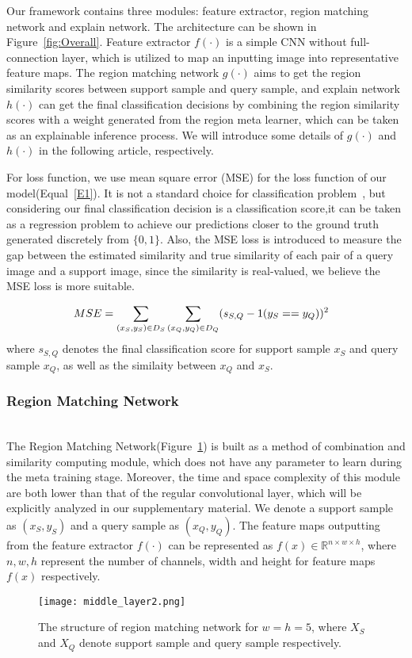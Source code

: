 \documentclass[letterpaper]{article}
\begin{document}
Our framework contains three modules: feature extractor, region matching network and explain network. The architecture can be shown in Figure~\ref{fig:Overall}. Feature extractor $f(\cdot)$ is a simple CNN without full-connection layer, which is utilized to map an inputting image into representative feature maps. The region matching network $g(\cdot)$ aims to get the region similarity scores between support sample and query sample, and explain network $h(\cdot)$ can get the final classification decisions by combining the region similarity scores with a weight generated from the region meta learner, which can be taken as an explainable inference process. We will introduce some details of $g(\cdot)$ and $h(\cdot)$ in the following article, respectively. 

For loss function, we use mean square error (MSE) for the loss function of our model(Equal~\ref{E1}). It is not a standard choice for classification problem~\cite{sung2018learning}, but considering our final classification decision is a classification score,it can be taken as a regression problem to achieve our predictions closer to the ground truth generated discretely from $\{0,1\}$. Also, the MSE loss is introduced to measure the gap between the estimated similarity and true similarity of each pair of a query image and a support image, since the similarity is real-valued, we believe the MSE loss is more suitable.

\begin{equation}\scriptsize
    MSE = \sum_{(x_{S},y_{S})\in D_{S}} \sum_{(x_{Q},y_{Q})\in D_{Q}} (s_{S,Q} - 1(y_{S}==y_{Q}))^2\quad \label{E1}
\end{equation}
where $s_{S,Q}$ denotes the final classification score for support sample $x_{S}$ and query sample $x_{Q}$, as well as the similaity between $x_{Q}$ and $x_{S}$.
\subsubsection{Region Matching Network}\label{subsubsection:matching}
~\\
The Region Matching Network(Figure~\ref{fig:middle}) is built as a method of combination and similarity computing module, which does not have any parameter to learn during the meta training stage. Moreover, the time and space complexity of this module are both lower than that of the regular convolutional layer, which will be explicitly analyzed in our supplementary material. We denote a support sample as $(x_{S},y_{S})$ and a query sample as $(x_{Q},y_{Q})$. The feature maps outputting from the feature extractor $f(\cdot)$ can be represented as $f(x)\in \mathbb{R}^{n\times w \times h}$, where $n,w,h$ represent the number of channels, width and height for feature maps $f(x)$ respectively. 
\begin{figure}
    \centering
    \texttt{[image: middle\_layer2.png]}
    \caption{The structure of region matching network for $w=h=5$, where $X_{S}$ and $X_{Q}$ denote support sample and query sample respectively.}
    \label{fig:middle}
\end{figure}
\end{document}
